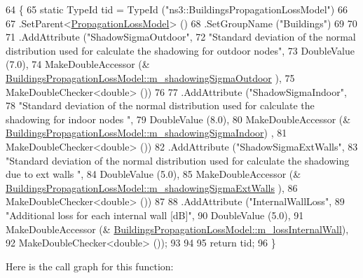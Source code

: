 \begin{DoxyCode}
64 \{
65   \textcolor{keyword}{static} TypeId tid = TypeId (\textcolor{stringliteral}{"ns3::BuildingsPropagationLossModel"})
66 
67     .SetParent<\hyperlink{classns3_1_1PropagationLossModel_ace8b78c2c8e805cd0a919d7e3543318c}{PropagationLossModel}> ()
68     .SetGroupName (\textcolor{stringliteral}{"Buildings"})
69 
70 
71     .AddAttribute (\textcolor{stringliteral}{"ShadowSigmaOutdoor"},
72                    \textcolor{stringliteral}{"Standard deviation of the normal distribution used for calculate the shadowing for
       outdoor nodes"},
73                    DoubleValue (7.0),
74                    MakeDoubleAccessor (&
      \hyperlink{classns3_1_1BuildingsPropagationLossModel_a60ae8ad7436c00d12e31f9ab1a4a3013}{BuildingsPropagationLossModel::m\_shadowingSigmaOutdoor}
      ),
75                    MakeDoubleChecker<double> ())
76 
77     .AddAttribute (\textcolor{stringliteral}{"ShadowSigmaIndoor"},
78                    \textcolor{stringliteral}{"Standard deviation of the normal distribution used for calculate the shadowing for
       indoor nodes "},
79                    DoubleValue (8.0),
80                    MakeDoubleAccessor (&
      \hyperlink{classns3_1_1BuildingsPropagationLossModel_a718e03b71e7e7fd97ae7cf16616fbe33}{BuildingsPropagationLossModel::m\_shadowingSigmaIndoor})
      ,
81                    MakeDoubleChecker<double> ())
82     .AddAttribute (\textcolor{stringliteral}{"ShadowSigmaExtWalls"},
83                    \textcolor{stringliteral}{"Standard deviation of the normal distribution used for calculate the shadowing due to
       ext walls "},
84                    DoubleValue (5.0),
85                    MakeDoubleAccessor (&
      \hyperlink{classns3_1_1BuildingsPropagationLossModel_a700799f95eeb988ac87beb44b49e65ee}{BuildingsPropagationLossModel::m\_shadowingSigmaExtWalls}
      ),
86                    MakeDoubleChecker<double> ())
87 
88     .AddAttribute (\textcolor{stringliteral}{"InternalWallLoss"},
89                    \textcolor{stringliteral}{"Additional loss for each internal wall [dB]"},
90                    DoubleValue (5.0),
91                    MakeDoubleAccessor (&
      \hyperlink{classns3_1_1BuildingsPropagationLossModel_add1b3e641ff9ad224cfdbb4d3a3db152}{BuildingsPropagationLossModel::m\_lossInternalWall}),
92                    MakeDoubleChecker<double> ());
93 
94 
95   \textcolor{keywordflow}{return} tid;
96 \}
\end{DoxyCode}


Here is the call graph for this function\+:


